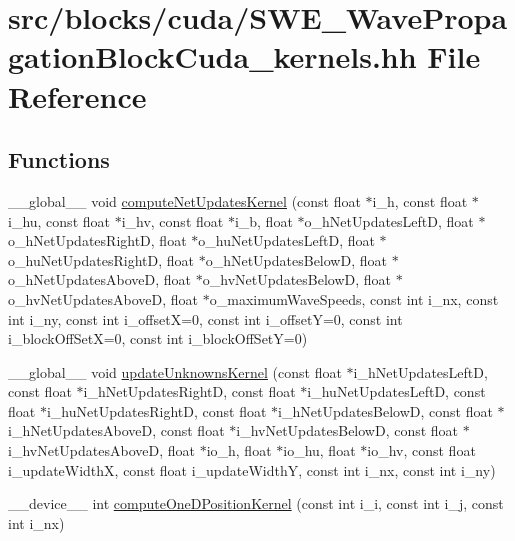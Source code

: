\hypertarget{SWE__WavePropagationBlockCuda__kernels_8hh}{\section{src/blocks/cuda/\-S\-W\-E\-\_\-\-Wave\-Propagation\-Block\-Cuda\-\_\-kernels.hh File Reference}
\label{SWE__WavePropagationBlockCuda__kernels_8hh}
}
\subsection*{Functions}
\begin{DoxyCompactItemize}
\item 
\-\_\-\-\_\-global\-\_\-\-\_\- void \hyperlink{SWE__WavePropagationBlockCuda__kernels_8hh_a2bc584d7ead34df704e1c977c38c98bf}{compute\-Net\-Updates\-Kernel} (const float $\ast$i\-\_\-h, const float $\ast$i\-\_\-hu, const float $\ast$i\-\_\-hv, const float $\ast$i\-\_\-b, float $\ast$o\-\_\-h\-Net\-Updates\-Left\-D, float $\ast$o\-\_\-h\-Net\-Updates\-Right\-D, float $\ast$o\-\_\-hu\-Net\-Updates\-Left\-D, float $\ast$o\-\_\-hu\-Net\-Updates\-Right\-D, float $\ast$o\-\_\-h\-Net\-Updates\-Below\-D, float $\ast$o\-\_\-h\-Net\-Updates\-Above\-D, float $\ast$o\-\_\-hv\-Net\-Updates\-Below\-D, float $\ast$o\-\_\-hv\-Net\-Updates\-Above\-D, float $\ast$o\-\_\-maximum\-Wave\-Speeds, const int i\-\_\-nx, const int i\-\_\-ny, const int i\-\_\-offset\-X=0, const int i\-\_\-offset\-Y=0, const int i\-\_\-block\-Off\-Set\-X=0, const int i\-\_\-block\-Off\-Set\-Y=0)
\item 
\-\_\-\-\_\-global\-\_\-\-\_\- void \hyperlink{SWE__WavePropagationBlockCuda__kernels_8hh_a8b864dfc09bf8e43d7f2849fb74add2e}{update\-Unknowns\-Kernel} (const float $\ast$i\-\_\-h\-Net\-Updates\-Left\-D, const float $\ast$i\-\_\-h\-Net\-Updates\-Right\-D, const float $\ast$i\-\_\-hu\-Net\-Updates\-Left\-D, const float $\ast$i\-\_\-hu\-Net\-Updates\-Right\-D, const float $\ast$i\-\_\-h\-Net\-Updates\-Below\-D, const float $\ast$i\-\_\-h\-Net\-Updates\-Above\-D, const float $\ast$i\-\_\-hv\-Net\-Updates\-Below\-D, const float $\ast$i\-\_\-hv\-Net\-Updates\-Above\-D, float $\ast$io\-\_\-h, float $\ast$io\-\_\-hu, float $\ast$io\-\_\-hv, const float i\-\_\-update\-Width\-X, const float i\-\_\-update\-Width\-Y, const int i\-\_\-nx, const int i\-\_\-ny)
\item 
\-\_\-\-\_\-device\-\_\-\-\_\- int \hyperlink{SWE__WavePropagationBlockCuda__kernels_8hh_aa1828414f270d255b05e877dd2f8b7df}{compute\-One\-D\-Position\-Kernel} (const int i\-\_\-i, const int i\-\_\-j, const int i\-\_\-nx)
\end{DoxyCompactItemize}



